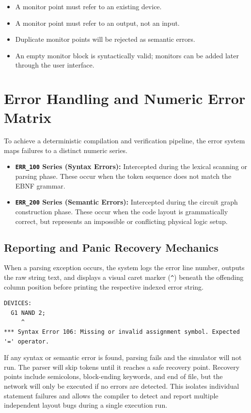 \documentclass[10pt,a4paper]{article}
\begin{document}
\begin{itemize}
    \item A monitor point must refer to an existing device.
    \item A monitor point must refer to an output, not an input.
    \item Duplicate monitor points will be rejected as semantic errors.
    \item An empty monitor block is syntactically valid; monitors can be added
    later through the user interface.
\end{itemize}

\section{Error Handling and Numeric Error Matrix}

To achieve a deterministic compilation and verification pipeline, the error system maps failures to a distinct numeric series. 

\begin{itemize}
    \item \textbf{\texttt{ERR\_100} Series (Syntax Errors):} Intercepted during the lexical scanning or parsing phase. These occur when the token sequence does not match the EBNF grammar. 
    \item \textbf{\texttt{ERR\_200} Series (Semantic Errors):} Intercepted during the circuit graph construction phase. These occur when the code layout is grammatically correct, but represents an impossible or conflicting physical logic setup.
\end{itemize}

\subsection{Reporting and Panic Recovery Mechanics}
When a parsing exception occurs, the system logs the error line number, outputs the raw string text, and displays a visual caret marker (\texttt{\^{}}) beneath the offending column position before printing the respective indexed error string.

\begin{verbatim}
DEVICES:
  G1 NAND 2;
     ^
*** Syntax Error 106: Missing or invalid assignment symbol. Expected '=' operator.
\end{verbatim}

If any syntax or semantic error is found, parsing fails and the simulator will not run. The parser will skip tokens until it reaches a safe recovery point. Recovery
points include semicolons, block-ending keywords, and end of file, but the network will only be executed if no errors are
detected. This isolates individual statement failures and allows the compiler to detect and report multiple independent layout bugs during a single execution run. 
\end{document}
